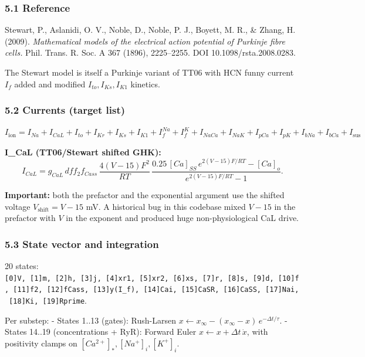 \documentclass[
  11pt,
]{article}
\begin{document}
\hypertarget{reference}{%
\subsubsection{5.1 Reference}\label{reference}}

Stewart, P., Aslanidi, O. V., Noble, D., Noble, P. J., Boyett, M. R., \&
Zhang, H. (2009). \emph{Mathematical models of the electrical action
potential of Purkinje fibre cells.} Phil. Trans. R. Soc. A 367 (1896),
2225--2255. DOI 10.1098/rsta.2008.0283.

The Stewart model is itself a Purkinje variant of TT06 with HCN funny
current \(I_f\) added and modified \(I_{to}, I_{Ks}, I_{K1}\) kinetics.

\hypertarget{currents-target-list}{%
\subsubsection{5.2 Currents (target list)}\label{currents-target-list}}

\(I_\mathrm{ion} = I_{Na} + I_{CaL} + I_{to} + I_{Kr} + I_{Ks} + I_{K1} + I_f^{Na} + I_f^K + I_{NaCa} + I_{NaK} + I_{pCa} + I_{pK} + I_{bNa} + I_{bCa} + I_\mathrm{sus}\)

\textbf{I\_CaL (TT06/Stewart shifted GHK):}
\[I_{CaL} = g_{CaL}\, d f f_2 f_{Cass}\, \frac{4(V-15)F^2}{RT}\, \frac{0.25\,[Ca]_{SS}\,e^{2(V-15)F/RT} - [Ca]_o}{e^{2(V-15)F/RT} - 1}.\]

\textbf{Important:} both the prefactor and the exponential argument use
the shifted voltage \(V_\mathrm{shift} = V - 15\) mV. A historical bug
in this codebase mixed \(V-15\) in the prefactor with \(V\) in the
exponent and produced huge non-physiological CaL drive.

\hypertarget{state-vector-and-integration}{%
\subsubsection{5.3 State vector and
integration}\label{state-vector-and-integration}}

20 states:
\texttt{{[}0{]}V,\ {[}1{]}m,\ {[}2{]}h,\ {[}3{]}j,\ {[}4{]}xr1,\ {[}5{]}xr2,\ {[}6{]}xs,\ {[}7{]}r,\ {[}8{]}s,\ {[}9{]}d,\ {[}10{]}f,\ {[}11{]}f2,\ {[}12{]}fCass,\ {[}13{]}y(I\_f),\ {[}14{]}Cai,\ {[}15{]}CaSR,\ {[}16{]}CaSS,\ {[}17{]}Nai,\ {[}18{]}Ki,\ {[}19{]}Rprime}.

Per substep: - States 1..13 (gates): Rush-Larsen
\(x \leftarrow x_\infty - (x_\infty - x)\,e^{-\Delta t/\tau}\). - States
14..19 (concentrations + RyR): Forward Euler
\(x \leftarrow x + \Delta t\,\dot x\), with positivity clamps on
\([Ca^{2+}]_*, [Na^+]_i, [K^+]_i\).
\end{document}
